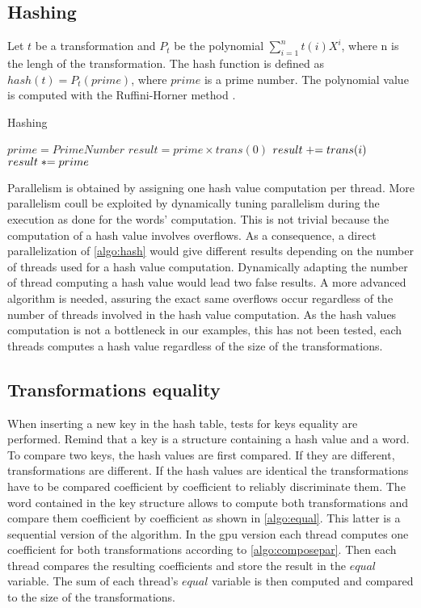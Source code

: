 {\subsection{Hashing}
\label{part:hash}
Let $t$ be a transformation and $P_{t}$ be the polynomial $\displaystyle\sum_{i=1}^{n} t(i)X^i$, where n is the lengh of the transformation.
The hash function is defined as $hash(t) = P_{t}(prime)$, where $prime$ is a prime number.
The polynomial value is computed with the Ruffini-Horner method \cite{borwein2012polynomials}.
\begin{algorithm}
\caption{Hashing}
\label{algo:hash}
\begin{algorithmic}
\STATE $prime = PrimeNumber$
\STATE $result = prime \times trans(0)$
\STATE $\switch result += trans(i)$
\STATE $\switch result *= prime$
\ENDFOR
\end{algorithmic}
\end{algorithm}
Parallelism is obtained by assigning one hash value computation per thread.
More parallelism coull be exploited by dynamically tuning parallelism during the execution as done for the words' computation.
This is not trivial because the computation of a hash value involves overflows. 
As a consequence, a direct parallelization of \autoref{algo:hash} would give different results depending on the number of threads used for a hash value computation. 
Dynamically adapting the number of thread computing a hash value would lead two false results. 
A more advanced algorithm is needed, assuring the exact same overflows occur regardless of the number of threads involved in the hash value computation. 
As the hash values computation is not a bottleneck in our examples, this has not been tested, each threads computes a hash value regardless of the size of the transformations.


\subsection{Transformations equality}
\label{part:equality}
When inserting a new key in the hash table, tests for keys equality are performed.
Remind that a key is a structure containing a hash value and a word.
To compare two keys, the hash values are first compared. If they are different, transformations are different.
If the hash values are identical the transformations have to be compared coefficient by coefficient to reliably discriminate them. 
The word contained in the key structure allows to compute both transformations and compare them coefficient by coefficient as shown in \autoref{algo:equal}.
This latter is a sequential version of the algorithm.
In the \gls{gpu} version each thread computes one coefficient for both transformations according to \autoref{algo:composepar}. 
Then each thread compares the resulting coefficients and store the result in the $equal$ variable. 
The sum of each thread's $equal$ variable is then computed and compared to the size of the transformations.

}
